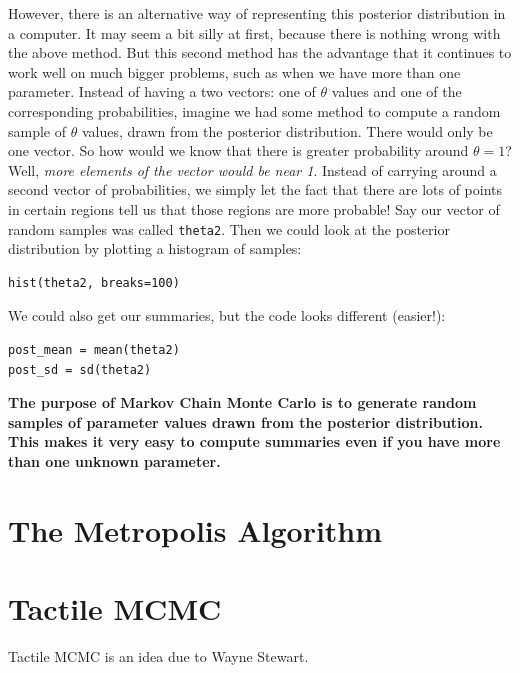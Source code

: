 However,
there is an alternative way of representing this posterior distribution in a
computer. It may seem a bit silly at first, because there is nothing wrong with
the above method. But this second method has the advantage that it continues to
work well on much bigger problems, such as when we have more than one parameter.
Instead of having a two vectors: one of $\theta$ values and one of the
corresponding probabilities,
imagine we had some method to compute a random sample of $\theta$ values, drawn
from the posterior distribution. There would only be one vector. So how would we
know that there is greater probability around $\theta=1$? Well, {\it more elements
of the vector would be near 1}. Instead of carrying around a second vector of
probabilities, we simply let the fact that there are lots of points in certain
regions tell us that those regions are more probable! Say our vector of random
samples was called {\tt theta2}. Then we could look at the posterior distribution
by plotting a histogram of samples:
\begin{verbatim}
hist(theta2, breaks=100)
\end{verbatim}
We could also get our summaries, but the code looks different (easier!):
\begin{verbatim}
post_mean = mean(theta2)
post_sd = sd(theta2)
\end{verbatim}






\begin{framed}
{\bf
The purpose of Markov Chain Monte Carlo is to generate random samples of
parameter values drawn from the posterior distribution. This makes it very easy
to compute summaries even if you have more than one unknown parameter.}
\end{framed}


\section{The Metropolis Algorithm}

\section{Tactile MCMC}

Tactile MCMC is an idea due to Wayne Stewart.

